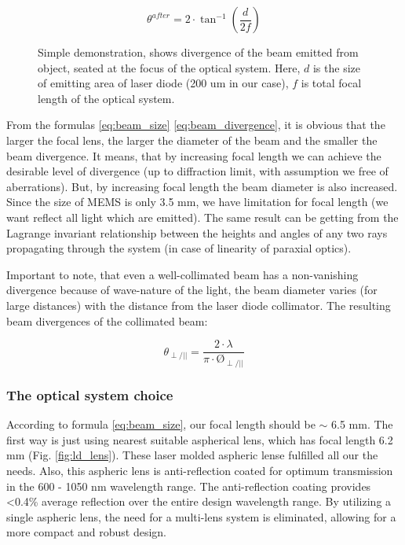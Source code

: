 \begin{figure}[H]
\begin{minipage}[h]{0.52\linewidth}
\end{minipage}
\hfill
\begin{minipage}[h]{0.45\linewidth}
\begin{equation}\label{eq:beam_divergence}
\theta^{after} = 2 \cdot \tan^{-1}{(\frac{d}{2f})}
\end{equation}
\end{minipage}
\caption{
Simple demonstration, shows divergence of the beam emitted from object, seated at the focus of the optical system. Here, $d$ is the size of emitting area of laser diode (200 um in our case), $f$ is total focal length of the optical system.
}
\label{fig:lens}
\end{figure}





From the formulas \ref{eq:beam_size} \ref{eq:beam_divergence}, it is obvious that the larger the focal lens, the larger the diameter of the beam and the smaller the beam divergence. It means, that by increasing focal length we can achieve the desirable level of divergence (up to diffraction limit, with assumption we free of aberrations). But, by increasing focal length the beam diameter is also increased.
Since the size of MEMS is only 3.5 mm, we have limitation for focal length (we want reflect all light which are emitted).
The same result can be getting from the Lagrange invariant relationship between the heights and angles of any two rays propagating through the system (in case of linearity of paraxial optics).

Important to note, that even a well-collimated beam has a non-vanishing divergence because of wave-nature of the light, the beam diameter varies (for large distances) with the distance from the laser diode collimator. The resulting beam divergences of the collimated beam:



\begin{equation}\label{eq:beam_divergence}
\theta_{\perp/||} = \frac{2\cdot \lambda}{\pi \cdot \text{\O}_{\perp/||}}
\end{equation}

\subsubsection{The optical system choice}
According to formula \ref{eq:beam_size}, our focal length should be $\sim$ 6.5 mm.
The first way is just using nearest suitable aspherical lens, which has focal length 6.2 mm (Fig. \ref{fig:ld_lens}).
These laser molded aspheric lense fulfilled all our the needs. Also, this aspheric lens is anti-reflection coated for optimum transmission in the 600 - 1050 nm wavelength range. The anti-reflection coating provides <0.4\% average reflection over the entire design wavelength range. By utilizing a single aspheric lens, the need for a multi-lens system is eliminated, allowing for a more compact and robust design. 


